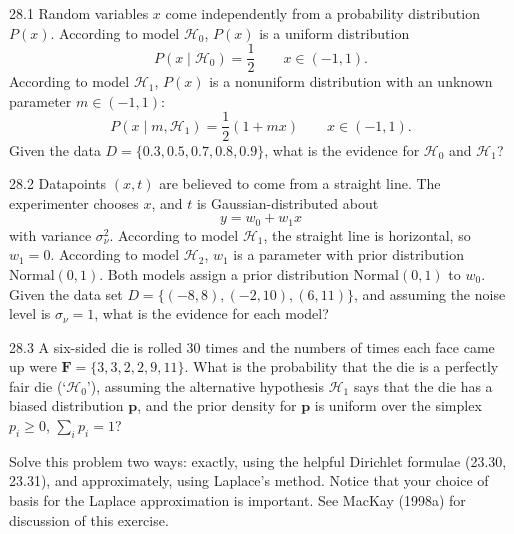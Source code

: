 \documentclass[12pt, a4paper]{article}
\begin{document}
\begin{prob}{28.1}
Random variables $x$ come independently from a probability distribution $P(x)$. According to model $\mathcal{H}_0$, $P(x)$ is a uniform distribution
\[
P(x \mid \mathcal{H}_0) = \frac{1}{2} \qquad x \in (-1, 1).
\]
According to model $\mathcal{H}_1$, $P(x)$ is a nonuniform distribution with an unknown parameter $m \in (-1, 1)$:
\[
P(x \mid m, \mathcal{H}_1) = \frac{1}{2}(1 + mx) \qquad x \in (-1, 1).
\]
Given the data $D = \{0.3, 0.5, 0.7, 0.8, 0.9\}$, what is the evidence for $\mathcal{H}_0$ and $\mathcal{H}_1$?
\end{prob}
\begin{sol}
\end{sol}
\bigskip

\begin{prob}{28.2}
Datapoints $(x, t)$ are believed to come from a straight line. The experimenter chooses $x$, and $t$ is Gaussian-distributed about
\[
y = w_0 + w_1 x
\]
with variance $\sigma_\nu^2$. According to model $\mathcal{H}_1$, the straight line is horizontal, so $w_1 = 0$. According to model $\mathcal{H}_2$, $w_1$ is a parameter with prior distribution $\text{Normal}(0, 1)$. Both models assign a prior distribution $\text{Normal}(0, 1)$ to $w_0$. Given the data set $D = \{(-8, 8), (-2, 10), (6, 11)\}$, and assuming the noise level is $\sigma_\nu = 1$, what is the evidence for each model?
\end{prob}
\begin{sol}
\end{sol}
\bigskip

\begin{prob}{28.3}
A six-sided die is rolled 30 times and the numbers of times each face came up were $\mathbf{F} = \{3, 3, 2, 2, 9, 11\}$. What is the probability that the die is a perfectly fair die (`$\mathcal{H}_0$'), assuming the alternative hypothesis $\mathcal{H}_1$ says that the die has a biased distribution $\mathbf{p}$, and the prior density for $\mathbf{p}$ is uniform over the simplex $p_i \geq 0$, $\sum_i p_i = 1$?

Solve this problem two ways: exactly, using the helpful Dirichlet formulae (23.30, 23.31), and approximately, using Laplace's method. Notice that your choice of basis for the Laplace approximation is important. See MacKay (1998a) for discussion of this exercise.
\end{prob}
\begin{sol}
\end{sol}
\bigskip
\end{document}
